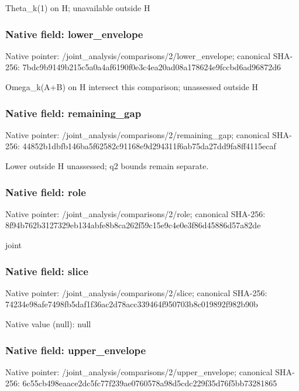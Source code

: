 \documentclass[10pt,a4paper]{article}
\begin{document}
\begingroup\raggedright\sloppy Theta\_\allowbreak{}k(1) on H;\allowbreak{} unavailable outside H\par\endgroup

\subsubsection{Native field: lower\_\allowbreak{}envelope}
Native pointer: /joint\_\allowbreak{}analysis/comparisons/2/lower\_\allowbreak{}envelope; canonical SHA-256: 7bdc9b9149b215c5a0a4af6190f0e3c4ea20ad08a178624e9fccbd6ad96872d6

\begingroup\raggedright\sloppy Omega\_\allowbreak{}k(A+B) on H intersect this comparison;\allowbreak{} unassessed outside H\par\endgroup

\subsubsection{Native field: remaining\_\allowbreak{}gap}
Native pointer: /joint\_\allowbreak{}analysis/comparisons/2/remaining\_\allowbreak{}gap; canonical SHA-256: 44852b1dbfb146ba5f62582c91168e9d294311f6ab75da27dd9fa8ff4115ecaf

\begingroup\raggedright\sloppy Lower outside H unassessed;\allowbreak{} q2 bounds remain separate.\par\endgroup

\subsubsection{Native field: role}
Native pointer: /joint\_\allowbreak{}analysis/comparisons/2/role; canonical SHA-256: 8f94b762b3127329eb134abfe8b8ca262f59c15e9c4e0e3f86d45886d57a82de

\begingroup\raggedright\sloppy joint\par\endgroup

\subsubsection{Native field: slice}
Native pointer: /joint\_\allowbreak{}analysis/comparisons/2/slice; canonical SHA-256: 74234e98afe7498fb5daf1f36ac2d78acc339464f950703b8c019892f982b90b

Native value (null): null

\subsubsection{Native field: upper\_\allowbreak{}envelope}
Native pointer: /joint\_\allowbreak{}analysis/comparisons/2/upper\_\allowbreak{}envelope; canonical SHA-256: 6c55cb498eaace2dc5fc77f239ae0760578a98d5cdc229f35d76f5bb73281865
\end{document}
